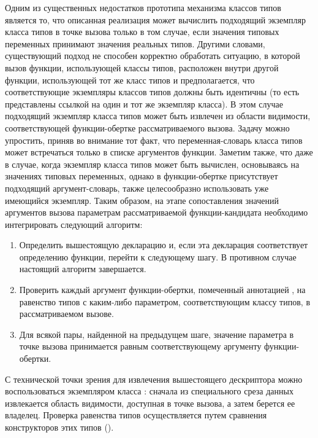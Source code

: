 Одним из существенных недостатков прототипа механизма классов типов является то, что описанная реализация может вычислить подходящий экземпляр класса типов в точке вызова только в том случае, если значения типовых переменных принимают значения реальных типов. Другими словами, существующий подход не способен корректно обработать ситуацию, в которой вызов функции, использующей классы типов, расположен внутри другой функции, использующей тот же класс типов и предполагается, что соответствующие экземпляры классов типов должны быть идентичны (то есть представлены ссылкой на один и тот же экземпляр класса). В этом случае подходящий экземпляр класса типов может быть извлечен из области видимости, соответствующей функции-обертке рассматриваемого вызова. Задачу можно упростить, приняв во внимание тот факт, что переменная-словарь класса типов может встречаться только в списке аргументов функции. Заметим также, что даже в случае, когда экземпляр класса типов может быть вычислен, основываясь на значениях типовых переменных, однако в функции-обертке присутствует подходящий аргумент-словарь, также целесообразно использовать уже имеющийся экземпляр. Таким образом, на этапе сопоставления значений аргументов вызова параметрам рассматриваемой функции-кандидата необходимо интегрировать следующий алгоритм:
\begin{enumerate}
    \item Определить вышестоящую декларацию и, если эта декларация соответствует определению функции, перейти к следующему шагу. В противном случае настоящий алгоритм завершается.
    \item Проверить каждый аргумент функции-обертки, помеченный аннотацией , на равенство типов с каким-либо параметром, соответствующим классу типов, в рассматриваемом вызове.
    \item Для всякой пары, найденной на предыдущем шаге, значение параметра в точке вызова принимается равным соответствующему аргументу функции-обертки.
\end{enumerate} 
С технической точки зрения для извлечения вышестоящего дескриптора можно воспользоваться экземпляром класса : сначала из специального среза данных извлекается область видимости, доступная в точке вызова, а затем берется ее владелец. Проверка равенства типов осуществляется путем сравнения конструкторов этих типов ().

